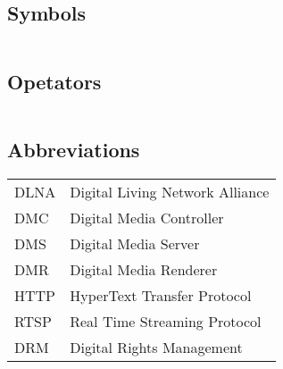 
\subsection*{Symbols}

\begin{tabular}{ll}

\end{tabular}

\subsection*{Opetators} 

\begin{tabular}{ll}

\end{tabular}

\subsection*{Abbreviations}

\begin{tabular}{ll}
DLNA       & Digital Living Network Alliance \\
DMC        & Digital Media Controller \\
DMS        & Digital Media Server \\
DMR        & Digital Media Renderer \\
HTTP       & HyperText Transfer Protocol \\
RTSP       & Real Time Streaming Protocol \\ 
DRM        & Digital Rights Management \\ 
\end{tabular}
